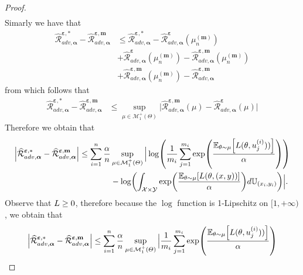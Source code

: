 \begin{proof}
\begin{align*}
\end{align*}
Simarly we have that
\begin{align*}
\widehat{\mathcal{R}}^{\bm{\varepsilon},*}_{adv,\bm{\alpha}} - \widehat{\mathcal{R}}^{\bm{\varepsilon},\textbf{m}}_{adv,\bm{\alpha}}&\leq \widehat{\mathcal{R}}^{\bm{\varepsilon},*}_{adv,\bm{\alpha}} -
\widehat{\mathcal{R}}^{\bm{\varepsilon}}_{adv,\bm{\alpha}}(\mu_n^{(\bm{m})})\\
&+\widehat{\mathcal{R}}^{\bm{\varepsilon}}_{adv,\bm{\alpha}}(\mu_n^{(\bm{m})}) - \widehat{\mathcal{R}}^{\bm{\varepsilon},\textbf{m}}_{adv,\bm{\alpha}}(\mu_n^{(\bm{m})}) \\
&+ \widehat{\mathcal{R}}^{\bm{\varepsilon},\textbf{m}}_{adv,\bm{\alpha}}(\mu_n^{(\bm{m})}) - \widehat{\mathcal{R}}^{\bm{\varepsilon},\textbf{m}}_{adv,\bm{\alpha}}
\end{align*}
from which follows that 
\begin{align*}
\widehat{\mathcal{R}}^{\bm{\varepsilon},*}_{adv,\bm{\alpha}} - \widehat{\mathcal{R}}^{\bm{\varepsilon},\textbf{m}}_{adv,\bm{\alpha}}&\leq  \sup_{\mu\in \mathcal{M}^+_1(\Theta)}\Big|\widehat{\mathcal{R}}^{\bm{\varepsilon},\textbf{m}}_{adv,\bm{\alpha}}(\mu) - \widehat{\mathcal{R}}^{\bm{\varepsilon}}_{adv,\bm{\alpha}}(\mu) \Big| 
\end{align*}
Therefore we obtain that 
\begin{align*}
\Big| \widehat{\mathcal{R}}^{\bm{\varepsilon},*}_{adv,\bm{\alpha}} - \widehat{\mathcal{R}}^{\bm{\varepsilon},\textbf{m}}_{adv,\bm{\alpha}}\Big |\leq 
\sum_{i=1}^\numsamples\frac{\alpha}{\numsamples}  &\sup_{\mu\in \mathcal{M}^+_1(\Theta)}\Big|\log\left(\frac{1}{m_i}\sum_{j=1}^{m_i}\exp\left(\frac{\mathbb{E}_{\theta \sim \mu}\left[\loss(\theta,u_j^{(i)}))\right]}{\alpha}\right)\right)\\
    &- \log\left(\int_{\mathcal{X}\times\mathcal{Y}}\exp\left(\frac{\mathbb{E}_{\theta \sim \mu}\left[\loss(\theta,(x,y))\right]}{\alpha}\right) d\mathbb{U}_{(x_i,y_i)} \right)\Big|.
\end{align*}
Observe that $L\geq 0$, therefore because the $\log$ function is 1-Lipschitz on $[1,+\infty)$, we obtain that 
\begin{align*}
\Big| \widehat{\mathcal{R}}^{\bm{\varepsilon},*}_{adv,\bm{\alpha}} - \widehat{\mathcal{R}}^{\bm{\varepsilon},\textbf{m}}_{adv,\bm{\alpha}}\Big |
\leq 
\sum_{i=1}^\numsamples\frac{\alpha}{\numsamples}  &\sup_{\mu\in \mathcal{M}^+_1(\Theta)}\Big |\frac{1}{m_i}\sum_{j=1}^{m_i}\exp\left(\frac{\mathbb{E}_{\theta \sim \mu}\left[\loss(\theta,u_j^{(i)}))\right]}{\alpha}\right)\\

\end{align*}
\end{proof}
